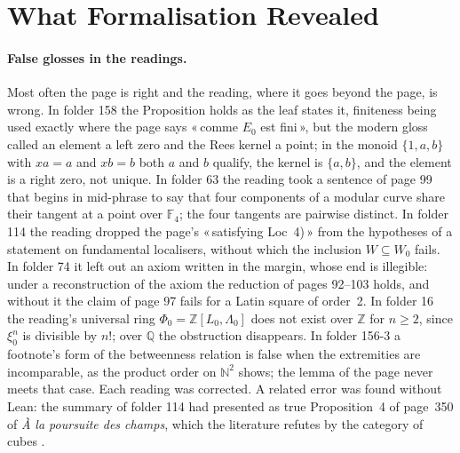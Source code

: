 \documentclass[runningheads,a4paper]{llncs}
\newcommand{\q}[1]{«\,#1\,»}
\begin{document}
\section{What Formalisation Revealed}\label{sec:found}

\paragraph{False glosses in the readings.} Most often the page is right and the reading, where it goes beyond the page, is wrong. In folder 158 the Proposition holds as the leaf states it, finiteness being used exactly where the page says \q{comme $E_0$ est fini}, but the modern gloss called an element a left zero and the Rees kernel a point; in the monoid $\{1,a,b\}$ with $xa = a$ and $xb = b$ both $a$ and $b$ qualify, the kernel is $\{a,b\}$, and the element is a right zero, not unique. In folder 63 the reading took a sentence of page 99 that begins in mid-phrase to say that four components of a modular curve share their tangent at a point over $\mathbb F_4$; the four tangents are pairwise distinct. In folder 114 the reading dropped the page's \q{satisfying Loc~4)} from the hypotheses of a statement on fundamental localisers, without which the inclusion $W \subseteq W_0$ fails. In folder 74 it left out an axiom written in the margin, whose end is illegible: under a reconstruction of the axiom the reduction of pages 92--103 holds, and without it the claim of page 97 fails for a Latin square of order~2. In folder 16 the reading's universal ring $\Phi_0 = \mathbb Z[L_0, \Lambda_0]$ does not exist over $\mathbb Z$ for $n \geq 2$, since $\xi_0^n$ is divisible by $n!$; over $\mathbb Q$ the obstruction disappears. In folder 156-3 a footnote's form of the betweenness relation is false when the extremities are incomparable, as the product order on $\mathbb N^2$ shows; the lemma of the page never meets that case. Each reading was corrected. A related error was found without Lean: the summary of folder 114 had presented as true Proposition~4 of page~350 of \emph{À la poursuite des champs}, which the literature refutes by the category of cubes \cite{cisinski2006,maltsiniotis2005}.
\end{document}
